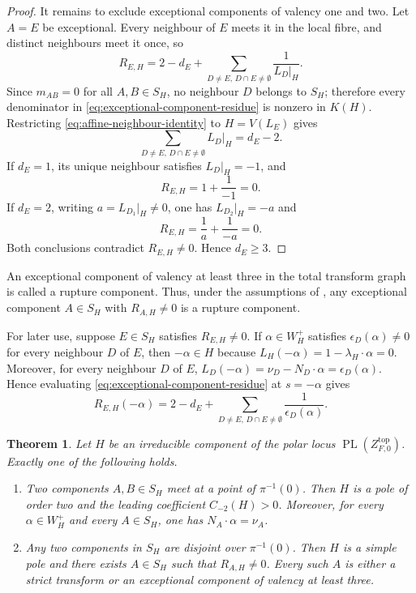 \documentclass[12pt]{amsart}
\numberwithin{equation}{section}
\theoremstyle{plain}
\newtheorem{theorem}{Theorem}[section]
\theoremstyle{definition}
\theoremstyle{remark}
\theoremstyle{definition}
\DeclareMathOperator{\PL}{PL}
\begin{document}
\begin{proof}
It remains to exclude exceptional components of valency one and two. Let $A=E$ be exceptional. Every neighbour of $E$ meets it in the local fibre, and distinct neighbours meet it once, so
\begin{equation}\label{eq:exceptional-component-residue}
    R_{E,H} = 2-d_E+\sum_{D\neq E,\, D\cap E\neq \emptyset}\frac{1}{L_D|_H}.
\end{equation}
Since $m_{AB}=0$ for all $A, B\in S_H$, no neighbour $D$ belongs to $S_H$; therefore every denominator in \eqref{eq:exceptional-component-residue} is nonzero in $K(H)$. Restricting \eqref{eq:affine-neighbour-identity} to $H=V(L_E)$ gives
\begin{equation}\label{eq:restricted-neighbour-sum}
    \sum_{D\neq E,\, D\cap E\neq \emptyset}L_D|_H=d_E-2.
\end{equation}
If $d_E=1$, its unique neighbour satisfies $L_D|_H=-1$, and
\[
    R_{E,H}=1+\frac1{-1}=0.
\]
If $d_E=2$, writing $a=L_{D_1}|_H\ne0$, one has
$L_{D_2}|_H=-a$ and
\[
    R_{E,H}=\frac1a+\frac1{-a}=0.
\]
Both conclusions contradict $R_{E,H}\neq 0$. Hence $d_E\ge3$.
\end{proof}

An exceptional component of valency at least three in the total transform graph is called a rupture component. Thus, under the assumptions of , any exceptional component $A\in S_H$ with $R_{A,H}\neq0$ is a rupture component.

For later use, suppose $E\in S_H$ satisfies $R_{E,H}\neq0$. If $\alpha\in W_H^+$ satisfies $\epsilon_D(\alpha)\neq0$ for every neighbour $D$ of $E$, then $-\alpha\in H$ because $L_H(-\alpha)=1-\lambda_H\cdot\alpha=0$. Moreover, for every neighbour $D$ of $E$, $L_D(-\alpha)=\nu_D-N_D\cdot\alpha=\epsilon_D(\alpha)$. Hence evaluating \eqref{eq:exceptional-component-residue} at $s=-\alpha$ gives
\begin{equation}\label{eq:selected-residue-at-alpha}
    R_{E,H}(-\alpha) = 2-d_E + \sum_{D\neq E,\, D\cap E\neq \emptyset}\frac{1}{\epsilon_D(\alpha)}.
\end{equation}

\begin{theorem}\label{thm:grouped-wall-dichotomy} 
Let $H$ be an irreducible component of the polar locus $\PL(Z^{\mathrm{top}}_{F,0})$. Exactly one of the following holds.
\begin{enumerate}[label=\textup{(\roman*)}]
\item Two components $A,B\in S_H$ meet at a point of $\pi^{-1}(0)$. Then $H$ is a pole of order two and the leading coefficient $C_{-2}(H)>0$. Moreover, for every $\alpha\in W_H^+$ and every $A\in S_H$, one has $N_A\cdot\alpha=\nu_A$.
\item Any two components in $S_H$ are disjoint over $\pi^{-1}(0)$. Then $H$ is a simple pole and there exists $A\in S_H$ such that $R_{A,H}\neq0$. Every such $A$ is either a strict transform or an exceptional component of valency at least three.
\end{enumerate}
\end{theorem}
\end{document}
